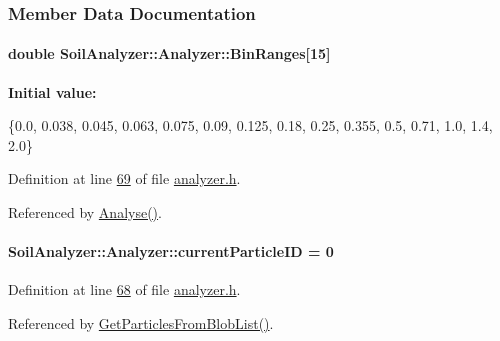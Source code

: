 \subsubsection{Member Data Documentation}
\hypertarget{class_soil_analyzer_1_1_analyzer_a5a8ee87a3017f91d7624ad700d2c14c6}{}
\paragraph[{Bin\+Ranges}]{\setlength{\rightskip}{0pt plus 5cm}double Soil\+Analyzer\+::\+Analyzer\+::\+Bin\+Ranges\mbox{[}15\mbox{]}\hspace{0.3cm}{\ttfamily [private]}}\label{class_soil_analyzer_1_1_analyzer_a5a8ee87a3017f91d7624ad700d2c14c6}
{\bfseries Initial value\+:}
\begin{DoxyCode}
\{0.0,  0.038, 0.045, 0.063, 0.075, 0.09, 0.125, 0.18,
                      0.25, 0.355, 0.5,   0.71,  1.0,   1.4,  2.0\}
\end{DoxyCode}


Definition at line \hyperlink{analyzer_8h_source_l00069}{69} of file \hyperlink{analyzer_8h_source}{analyzer.\+h}.



Referenced by \hyperlink{analyzer_8cpp_source_l00065}{Analyse()}.

\hypertarget{class_soil_analyzer_1_1_analyzer_a9cf8e0b0a007a986d2b5d1e2653e43bf}{}
\paragraph[{current\+Particle\+I\+D}]{ Soil\+Analyzer\+::\+Analyzer\+::current\+Particle\+I\+D = 0\hspace{0.3cm}{\ttfamily [private]}}\label{class_soil_analyzer_1_1_analyzer_a9cf8e0b0a007a986d2b5d1e2653e43bf}


Definition at line \hyperlink{analyzer_8h_source_l00068}{68} of file \hyperlink{analyzer_8h_source}{analyzer.\+h}.



Referenced by \hyperlink{analyzer_8cpp_source_l00322}{Get\+Particles\+From\+Blob\+List()}.

